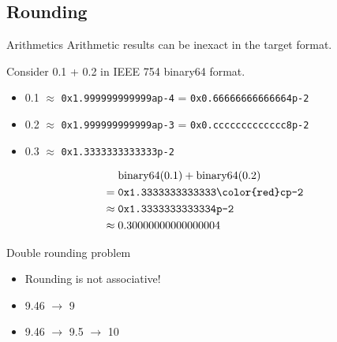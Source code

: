 \documentclass{beamer}
\begin{document}
\subsection{Rounding}
\begin{frame}{Arithmetics}
	Arithmetic results can be inexact in the target format.

	\begin{example}
		Consider 0.1 + 0.2 in IEEE 754 binary64 format.

		\begin{itemize}
			\item 0.1 $\approx$ \texttt{0x1.999999999999ap-4} = \texttt{0x0.6666666666666{\color{red}4}p-2}
			\item 0.2 $\approx$ \texttt{0x1.999999999999ap-3} = \texttt{0x0.ccccccccccccc{\color{red}8}p-2}
			\item 0.3 $\approx$ \texttt{0x1.3333333333333p-2}
		\end{itemize}
		\begin{align*}
			 & \text{binary64}(0.1) + \text{binary64}(0.2)
			\\ ={}& \texttt{0x1.3333333333333{\color{red}c}p-2}
			\\ \approx{}& \texttt{0x1.3333333333334p-2}
			\\ \approx{}& 0.30000000000000004
		\end{align*}
	\end{example}
\end{frame}

\begin{frame}{Double rounding problem}
	\begin{itemize}
		\item Rounding is not associative!
		\item 9.46 $\to$ 9
		\item 9.46 $\to$ 9.5 $\to$ 10
	\end{itemize}
\end{frame}

\end{document}
